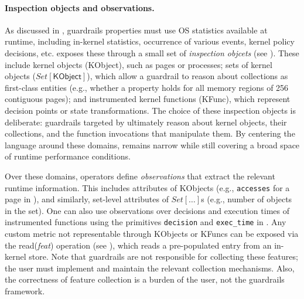 \paragraph{Inspection objects and observations.}
As discussed in , guardrails properties must use OS statistics available at runtime, including in-kernel statistics, occurrence of various events, kernel policy decisions, etc.
\lang exposes these through a small set of \emph{inspection objcets} (see ).
These include kernel objects (\textsf{KObject}), such as pages or processes; sets of kernel objects ($Set[\textsf{KObject}]$), which allow a guardrail to reason about collections as first-class entities (e.g., whether a property holds for all memory regions of 256 contiguous pages); and instrumented kernel functions (\textsf{KFunc}), which represent decision points or state transformations.
The choice of these inspection objects is deliberate: guardrails targeted by \lang ultimately reason about kernel objects, their collections, and the function invocations that manipulate them.
By centering the language around these domains, \lang remains narrow while still covering a broad space of runtime performance conditions. 

Over these domains,  operators define \emph{observations} that extract the relevant runtime information.
This includes attributes of \textsf{KObject}s (e.g., {\tt accesses} for a page in ), and similarly, set-level attributes of $Set[\ldots]$s (e.g., number of objects in the set).
One can also use observations over decisions and execution times of instrumented functions using the primitives {\tt decision} and {\tt exec\_time} in .
Any custom metric not representable through \textsf{KObject}s or \textsf{KFunc}s can be exposed via the {\sf read}(\textit{feat}) operation (see ), which reads a pre-populated entry from an in-kernel store.
Note that guardrails are not responsible for collecting these features; the user must implement and maintain the relevant collection mechanisms. 
Also, the correctness of feature collection is a burden of the user, not the guardrails framework.


